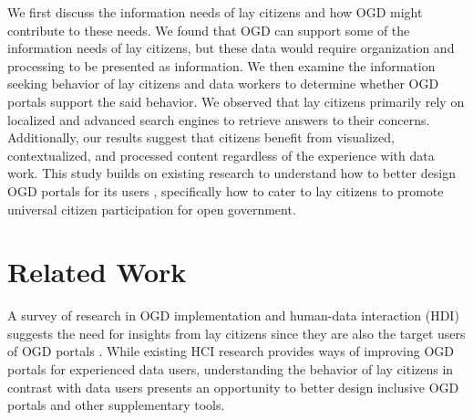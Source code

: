 \documentclass{sigchi}
\begin{document}
We first discuss the information needs of lay citizens and how OGD might contribute to these needs. We found that OGD can support some of the information needs of lay citizens, but these data would require organization and processing to be presented as information. We then examine the information seeking behavior of lay citizens and data workers to determine whether OGD portals support the said behavior. We observed that lay citizens primarily rely on localized and advanced search engines to retrieve answers to their concerns. Additionally, our results suggest that citizens benefit from visualized, contextualized, and processed content regardless of the experience with data work. This study builds on existing research to understand how to better design OGD portals for its users \cite{Choi2017, Erete2016, kacprzak2019characterising, Koesten2019, Koesten2017}, specifically how to cater to lay citizens to promote universal citizen participation for open government.


\section{Related Work}
A survey of research in OGD implementation and human-data interaction (HDI) suggests the need for insights from lay citizens since they are also the target users of OGD portals \cite{warwick2017}. While existing HCI research provides ways of improving OGD portals for experienced data users, understanding the behavior of lay citizens in contrast with data users presents an opportunity to better design inclusive OGD portals and other supplementary tools. 
\end{document}
